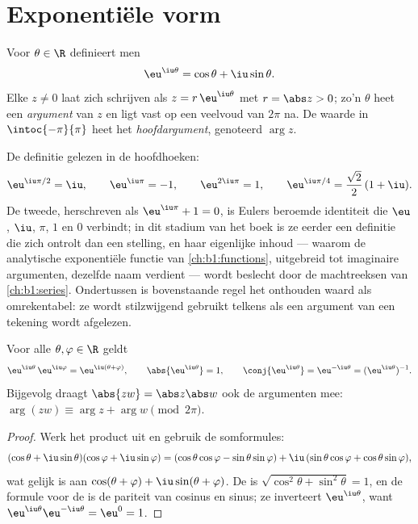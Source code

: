\section{Exponentiële vorm}

\begin{definition}\label{def:b1:complex:expi}
Voor $\theta \in \R$ definieert men
\[
\eu^{\iu\theta} = \cos\theta + \iu \sin\theta .
\]
Elke $z \neq 0$ laat zich schrijven als $z = r\,\eu^{\iu\theta}$ met $r =
\abs z > 0$; zo'n $\theta$ heet een \emph{argument} van
$z$ en ligt vast op een veelvoud van $2\pi$ na. De waarde in
$\intoc{-\pi}{\pi}$ heet het \emph{hoofdargument}, genoteerd $\arg z$.
\end{definition}

\begin{example}\label{ex:b1:complex:eulerid}
De definitie gelezen in de hoofdhoeken:
\[
\eu^{\iu\pi/2} = \iu, \qquad
\eu^{\iu\pi} = -1, \qquad
\eu^{2\iu\pi} = 1, \qquad
\eu^{\iu\pi/4} = \frac{\sqrt2}2\,(1 + \iu) .
\]
De tweede, herschreven als $\eu^{\iu\pi} + 1 = 0$, is Eulers beroemde
identiteit die $\eu$, $\iu$, $\pi$, $1$ en $0$ verbindt; in dit
stadium van het boek is ze eerder een definitie die zich ontrolt dan
een stelling, en haar eigenlijke inhoud --- waarom de analytische
exponentiële functie van \cref{ch:b1:functions}, uitgebreid tot
imaginaire argumenten, dezelfde naam verdient --- wordt beslecht door
de machtreeksen van \cref{ch:b1:series}. Ondertussen is bovenstaande
regel het onthouden waard als omrekentabel: ze wordt stilzwijgend
gebruikt telkens als een argument van een tekening wordt afgelezen.
\end{example}

\begin{theorem}[De functionaalvergelijking]\label{thm:b1:complex:funceq}
Voor alle $\theta, \varphi \in \R$ geldt
\[
\eu^{\iu\theta}\, \eu^{\iu\varphi} = \eu^{\iu(\theta + \varphi)},
\qquad
\abs{\eu^{\iu\theta}} = 1,
\qquad
\conj{\eu^{\iu\theta}} = \eu^{-\iu\theta} = (\eu^{\iu\theta})^{-1}.
\]
Bijgevolg draagt $\abs{zw} = \abs z \abs w$ ook de argumenten mee:
$\arg(zw) \equiv \arg z + \arg w \pmod{2\pi}$.
\end{theorem}

\begin{proof}
Werk het product uit en gebruik de somformules:
\[
(\cos\theta + \iu\sin\theta)(\cos\varphi + \iu\sin\varphi)
= (\cos\theta\cos\varphi - \sin\theta\sin\varphi)
+ \iu\,(\sin\theta\cos\varphi + \cos\theta\sin\varphi),
\]
wat gelijk is aan $\cos(\theta+\varphi) + \iu\sin(\theta+\varphi)$. De
 is $\sqrt{\cos^2\theta + \sin^2\theta} = 1$, en de formule voor
de  is de pariteit van cosinus en sinus; ze inverteert
$\eu^{\iu\theta}$, want $\eu^{\iu\theta}\eu^{-\iu\theta} = \eu^0 = 1$.
\end{proof}

